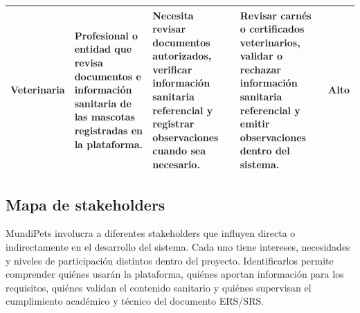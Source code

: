 \documentclass[journal,onecolumn]{IEEEtran}
\begin{document}
\begin{longtable}{|p{2.2cm}|p{3.4cm}|p{3.4cm}|p{3.7cm}|p{1.2cm}|}
		Veterinaria & Profesional o entidad que revisa documentos e información sanitaria de las mascotas registradas en la plataforma. & Necesita revisar documentos autorizados, verificar información sanitaria referencial y registrar observaciones cuando sea necesario. & Revisar carnés o certificados veterinarios, validar o rechazar información sanitaria referencial y emitir observaciones dentro del sistema. & Alto \\ \hline
	\end{longtable}
	
	\subsection{Mapa de stakeholders}
	\label{sec:stakeholders}
	
	MundiPets involucra a diferentes stakeholders que influyen directa o
	indirectamente en el desarrollo del sistema. Cada uno tiene intereses,
	necesidades y niveles de participación distintos dentro del proyecto.
	Identificarlos permite comprender quiénes usarán la plataforma, quiénes
	aportan información para los requisitos, quiénes validan el contenido
	sanitario y quiénes supervisan el cumplimiento académico y técnico del
	documento ERS/SRS.
	
\end{document}
